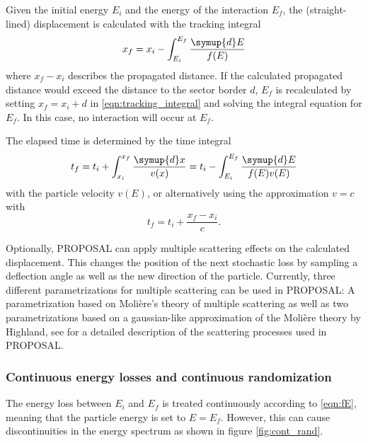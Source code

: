 Given the initial energy $E_i$ and the energy of the interaction $E_f$, the (straight-lined) displacement is calculated with the tracking integral
%
\begin{equation}
	\label{eqn:tracking_integral}
	x_f = x_i - \int_{E_i}^{E_f} \frac{\symup{d}E}{f(E)}
\end{equation}
%
where $x_f - x_i$ describes the propagated distance.
If the calculated propagated distance would exceed the distance to the sector border $d$, $E_f$ is recalculated by setting $x_f = x_i + d$ in \eqref{eqn:tracking_integral} and solving the integral equation for $E_f$.
In this case, no interaction will occur at $E_f$.

The elapsed time is determined by the time integral 
%
\begin{equation}
	t_f = t_i + \int_{x_i}^{x_f} \frac{\symup{d}x}{v(x)} = t_i - \int_{E_i}^{E_f} \frac{\symup{d}E}{f(E)v(E)}
\end{equation}
%
with the particle velocity $v(E)$, or alternatively using the approximation $v=c$ with 
%
\begin{equation}
	t_f = t_i + \frac{x_f - x_i}{c}.
\end{equation}

Optionally, PROPOSAL can apply multiple scattering effects on the calculated displacement.
This changes the position of the next stochastic loss by sampling a deflection angle as well as the new direction of the particle.
Currently, three different parametrizations for multiple scattering can be used in PROPOSAL:
A parametrization based on Molière's theory of multiple scattering as well as two parametrizations based on a gaussian-like approximation of the Molière theory by Highland, see \cite{GeiselBrinck2013RevisionOT} for a detailed description of the scattering processes used in PROPOSAL. 

\subsubsection{Continuous energy losses and continuous randomization}

The energy loss between $E_i$ and $E_f$ is treated continuously according to \eqref{eqn:fE}, meaning that the particle energy is set to $E = E_f$.
However, this can cause discontinuities in the energy spectrum as shown in figure \ref{fig:cont_rand}.

